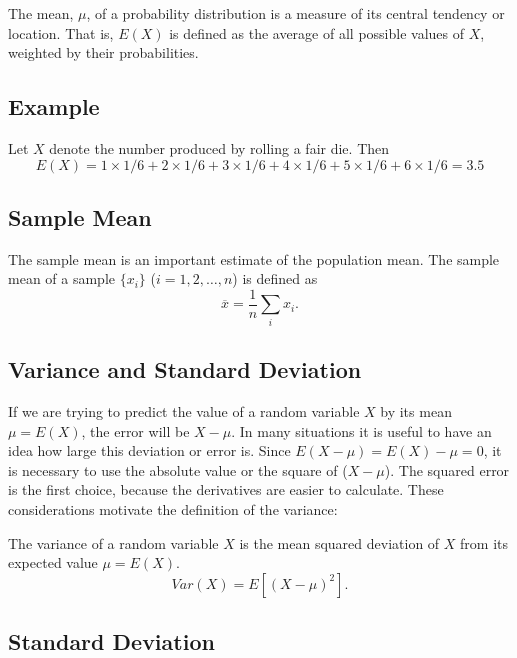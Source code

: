 \documentclass[
  letterpaper,
  DIV=11,
  numbers=noendperiod]{scrreprt}
\begin{document}
The mean, \(\mu\), of a probability distribution is a measure of its
central tendency or location. That is, \(E(X)\) is defined as the
average of all possible values of \(X\), weighted by their
probabilities.

\hypertarget{example}{%
\subsection{Example}\label{example}}

Let \(X\) denote the number produced by rolling a fair die. Then \[
E(X) = 1 \times 1/6 + 2 \times 1/6 + 3 \times 1/6 + 4 \times 1/6 + 5 \times 1/6 + 6\times 1/6 = 3.5 
\]

\hypertarget{sample-mean}{%
\subsection{Sample Mean}\label{sample-mean}}

The sample mean is an important estimate of the population mean. The
sample mean of a sample \(\{x_i\}\) (\(i=1,2,\ldots,n\)) is defined as
\[\overline{x}  = \frac{1}{n} \sum_i x_i.\]

\hypertarget{variance-and-standard-deviation}{%
\subsection{Variance and Standard
Deviation}\label{variance-and-standard-deviation}}

If we are trying to predict the value of a random variable \(X\) by its
mean \(\mu = E(X)\), the error will be \(X-\mu\). In many situations it
is useful to have an idea how large this deviation or error is. Since
\(E(X-\mu) = E(X) -\mu = 0\), it is necessary to use the absolute value
or the square of (\(X-\mu\)). The squared error is the first choice,
because the derivatives are easier to calculate. These considerations
motivate the definition of the variance:

The variance of a random variable \(X\) is the mean squared deviation of
\(X\) from its expected value \(\mu = E(X)\). \begin{equation}
Var(X) = E[ (X-\mu)^2].
\end{equation}

\hypertarget{standard-deviation}{%
\subsection{Standard Deviation}\label{standard-deviation}}
\end{document}
